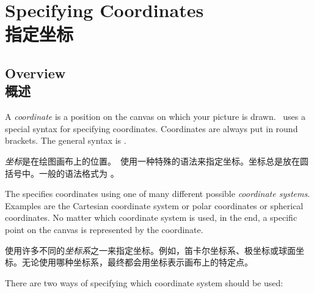 \setcounter{section}{12}
\setcounter{subsection}{4}
\setcounter{subsubsection}{2}
%
%
%


\section{Specifying Coordinates\\指定坐标}

\subsection{Overview\\概述}

A \emph{coordinate} is a position on the canvas on which your picture is drawn.
\tikzname\ uses a special syntax for specifying coordinates. Coordinates are
always put in round brackets. The general syntax is
.


\emph{坐标}是在绘图画布上的位置。\tikzname\ 使用一种特殊的语法来指定坐标。坐标总是放在圆括号中。一般的语法格式为
。


The  specifies coordinates using one of many
different possible \emph{coordinate systems}. Examples are the Cartesian
coordinate system or polar coordinates or spherical coordinates. No matter
which coordinate system is used, in the end, a specific point on the canvas is
represented by the coordinate.

使用许多不同的\emph{坐标系}之一来指定坐标。例如，笛卡尔坐标系、极坐标或球面坐标。无论使用哪种坐标系，最终都会用坐标表示画布上的特定点。

There are two ways of specifying which coordinate system should be used:


